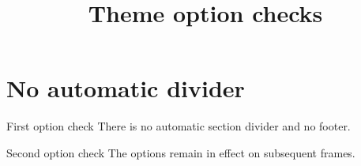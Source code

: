 \documentclass[aspectratio=169,11pt,t]{beamer}
\title{Theme option checks}
\author{}
\date{}
\begin{document}
\cityutitlepage
\section{No automatic divider}
\begin{frame}{First option check}
  There is no automatic section divider and no footer.
\end{frame}
\begin{frame}{Second option check}
  The options remain in effect on subsequent frames.
\end{frame}
\end{document}
